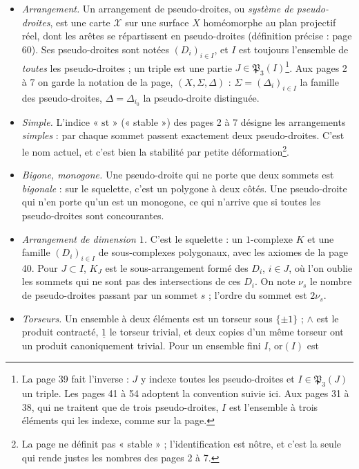 \documentclass[11pt,a4paper]{article}
\begin{document}
\begin{itemize}
  \item \emph{Arrangement.} Un arrangement de pseudo-droites, ou
  \emph{système de pseudo-droites}, est une carte $\mathcal{X}$ sur une
  surface $X$ homéomorphe au plan projectif réel, dont les arêtes se
  répartissent en pseudo-droites (définition précise : page 60). Ses
  pseudo-droites sont notées $(D_i)_{i \in I}$, et $I$ est toujours
  l'ensemble de \emph{toutes} les pseudo-droites ; un triple est une partie
  $J \in \mathfrak{P}_3(I)$\footnote{La page 39 fait l'inverse : $J$ y
  indexe toutes les pseudo-droites et $I \in \mathfrak{P}_3(J)$ un triple.
  Les pages 41 à 54 adoptent la convention suivie ici. Aux pages 31 à 38,
  qui ne traitent que de trois pseudo-droites, $I$ est l'ensemble à trois
  éléments qui les indexe, comme sur la page.}. Aux pages 2 à 7 on garde la
  notation de la page, $(X, \Sigma, \Delta)$ : $\Sigma = (\Delta_i)_{i \in I}$
  la famille des pseudo-droites, $\Delta = \Delta_{i_0}$ la pseudo-droite
  distinguée.
  \item \emph{Simple.} L'indice « $\mathrm{st}$ » (« stable ») des pages 2 à
  7 désigne les arrangements \emph{simples} : par chaque sommet passent
  exactement deux pseudo-droites. C'est le nom actuel, et c'est bien la
  stabilité par petite déformation\footnote{La page ne définit pas
  « stable » ; l'identification est nôtre, et c'est la seule qui rende
  justes les nombres des pages 2 à 7.}.
  \item \emph{Bigone, monogone.} Une pseudo-droite qui ne porte que deux
  sommets est \emph{bigonale} : sur le squelette, c'est un polygone à deux
  côtés. Une pseudo-droite qui n'en porte qu'un est un monogone, ce qui
  n'arrive que si toutes les pseudo-droites sont concourantes.
  \item \emph{Arrangement de dimension $1$.} C'est le squelette : un
  $1$-complexe $K$ et une famille $(D_i)_{i \in I}$ de sous-complexes
  polygonaux, avec les axiomes de la page 40. Pour $J \subset I$, $K_J$ est le
  sous-arrangement formé des $D_i$, $i \in J$, où l'on oublie les sommets
  qui ne sont pas des intersections de ces $D_i$. On note $\nu_s$ le nombre
  de pseudo-droites passant par un sommet $s$ ; l'ordre du sommet est
  $2\nu_s$.
  \item \emph{Torseurs.} Un ensemble à deux éléments est un torseur sous
  $\{\pm 1\}$ ; $\wedge$ est le produit contracté, $\underline{1}$ le
  torseur trivial, et deux copies d'un même torseur ont un produit
  canoniquement trivial. Pour un ensemble fini $I$, $\mathrm{or}(I)$ est

\end{itemize}
\end{document}
